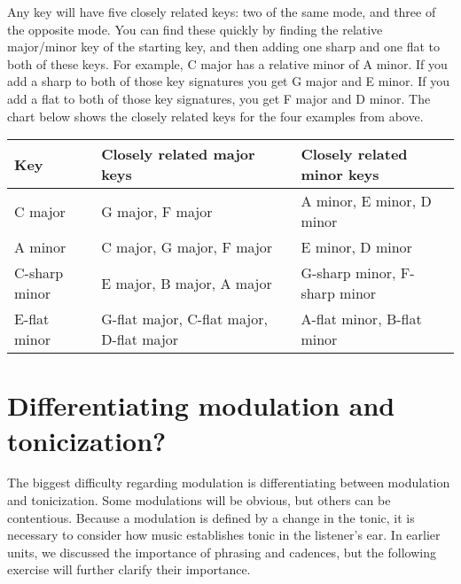 \documentclass{book}
\begin{document}
Any key will have five closely related keys: two of the same mode, and three
of the opposite mode. You can find these quickly by finding the relative
major/minor key of the starting key, and then adding one sharp and one flat to
both of these keys. For example, C major has a relative minor of A minor. If
you add a sharp to both of those key signatures you get G major and E minor.
If you add a flat to both of those key signatures, you get F major and D
minor. The chart below shows the closely related keys for the four examples
from above.

\begin{longtable}[]{@{}lll@{}}
\toprule
Key & Closely related major keys & Closely related minor keys \\
\midrule
\endhead
C major & G major, F major & A minor, E minor, D minor \\
A minor & C major, G major, F major & E minor, D minor \\
C-sharp minor & E major, B major, A major & G-sharp minor, F-sharp minor \\
E-flat minor & G-flat major, C-flat major, D-flat major & A-flat minor, B-flat
minor \\
\bottomrule
\end{longtable}

\hypertarget{differentiating-modulation-and-tonicization}{%
\section{Differentiating modulation and
tonicization?}\label{differentiating-modulation-and-tonicization}}

The biggest difficulty regarding modulation is differentiating between
modulation and tonicization. Some modulations will be obvious, but others can
be contentious. Because a modulation is defined by a change in the tonic, it
is necessary to consider how music establishes tonic in the listener's ear. In
earlier units, we discussed the importance of phrasing and cadences, but the
following exercise will further clarify their importance.
\end{document}
